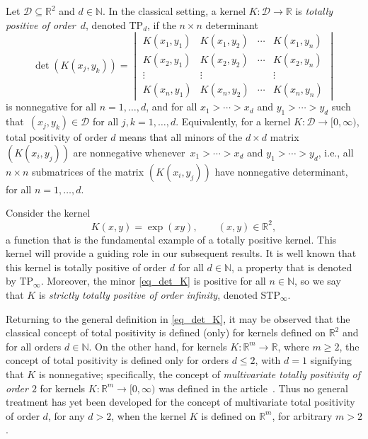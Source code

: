 \documentclass[10pt,a4paper]{amsart}
\numberwithin{equation}{section}
\def\N{{\mathbb N}}
\def\R{{\mathbb R}}
\def\mcalD{\mathcal{D}}
\begin{document}
Let $\mcalD \subseteq \R^2$ and $d \in \N$. In the classical setting, a kernel $K\colon \mcalD \to \R$ is {\it totally positive of order}~$d$, denoted TP$_d$, if the $n \times n$ determinant
\begin{equation}
\det(K(x_j,y_k)) =
\begin{vmatrix}
K(x_1,y_1) & K(x_1,y_2) & \cdots & K(x_1,y_n) \\
K(x_2,y_1) & K(x_2,y_2) & \cdots & K(x_2,y_n) \\
\vdots & \vdots & & \vdots \\
K(x_n,y_1) & K(x_n,y_2) & \cdots & K(x_n,y_n)
\end{vmatrix}\label{eq_det_K}
\end{equation}
is nonnegative for all $n=1,\dots,d$, and for all $x_1 > \cdots > x_d$ and $y_1 > \cdots > y_d$ such that~${(x_j,y_k) \in \mcalD}$ for all $j,k=1,\dots,d$. Equivalently, for a kernel $K \colon \mcalD \to [0,\infty)$, total positivity of order $d$ means that all minors of the $d \times d$ matrix $(K(x_i,y_j))$ are nonnegative whenever~${x_1 > \cdots > x_d}$ and $y_1 > \cdots > y_d$, i.e., all $n \times n$ submatrices of the matrix $(K(x_i,y_j))$ have nonnegative determinant, for all $n=1,\dots,d$.

Consider the kernel
\begin{equation}
K(x,y) = \exp(xy), \qquad (x,y) \in \R^2,\label{eq_exp_tp}
\end{equation}
a function that is the fundamental example of a totally positive kernel. This kernel will provide a guiding role in our subsequent results. It is well known that this kernel is totally positive of order $d$ for all $d \in \N$, a property that is denoted by TP$_\infty$. Moreover, the minor \eqref{eq_det_K} is positive for all $n \in \N$, so we say that $K$ is {\it strictly totally positive of order infinity}, denoted STP$_\infty$.

Returning to the general definition in \eqref{eq_det_K}, it may be observed that the classical concept of total positivity is defined (only) for kernels defined on $\R^2$ and for all orders $d \in \N$. On the other hand, for kernels $K \colon \R^m \to \R$, where $m \ge 2$, the concept of total positivity is defined only for orders $d \le 2$, with $d=1$ signifying that $K$ is nonnegative; specifically, the concept of {\it multivariate totally positivity of order $2$} for kernels $K \colon \R^m \to [0,\infty)$ was defined in the article~\cite{karlinrinott80}. Thus no general treatment has yet been developed for the concept of multivariate total positivity of order $d$, for any $d > 2$, when the kernel $K$ is defined on $\R^m$, for arbitrary $m > 2$.
\end{document}
